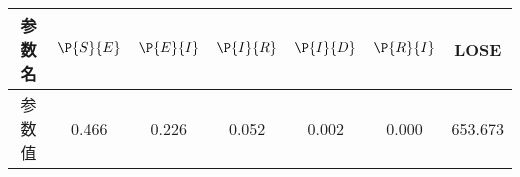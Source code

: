 \begin{tabular}{ccccccc}
\hline
参数名&$\P{S}{E}$&$\P{E}{I}$&$\P{I}{R}$&$\P{I}{D}$&$\P{R}{I}$&LOSE\\
\hline
参数值&0.466&0.226&0.052&0.002&0.000&653.673\\
\hline
\end{tabular}